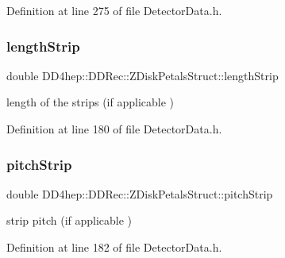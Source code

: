 Definition at line 275 of file Detector\+Data.\+h.

\hypertarget{struct_d_d4hep_1_1_d_d_rec_1_1_z_disk_petals_struct_a8319b709fefd285ffe4b3c09461d9990}{}\label{struct_d_d4hep_1_1_d_d_rec_1_1_z_disk_petals_struct_a8319b709fefd285ffe4b3c09461d9990} 
\subsubsection{\texorpdfstring{length\+Strip}{lengthStrip}}
{\footnotesize\ttfamily double D\+D4hep\+::\+D\+D\+Rec\+::\+Z\+Disk\+Petals\+Struct\+::length\+Strip}



length of the strips (if applicable ) 



Definition at line 180 of file Detector\+Data.\+h.

\hypertarget{struct_d_d4hep_1_1_d_d_rec_1_1_z_disk_petals_struct_a73e6274d9327c8e5aa26575ee6679dee}{}\label{struct_d_d4hep_1_1_d_d_rec_1_1_z_disk_petals_struct_a73e6274d9327c8e5aa26575ee6679dee} 
\subsubsection{\texorpdfstring{pitch\+Strip}{pitchStrip}}
{\footnotesize\ttfamily double D\+D4hep\+::\+D\+D\+Rec\+::\+Z\+Disk\+Petals\+Struct\+::pitch\+Strip}



strip pitch (if applicable ) 



Definition at line 182 of file Detector\+Data.\+h.

\hypertarget{struct_d_d4hep_1_1_d_d_rec_1_1_z_disk_petals_struct_a69d3bba6e63772378c1ceb4367a09bcd}{}\label{struct_d_d4hep_1_1_d_d_rec_1_1_z_disk_petals_struct_a69d3bba6e63772378c1ceb4367a09bcd} 
